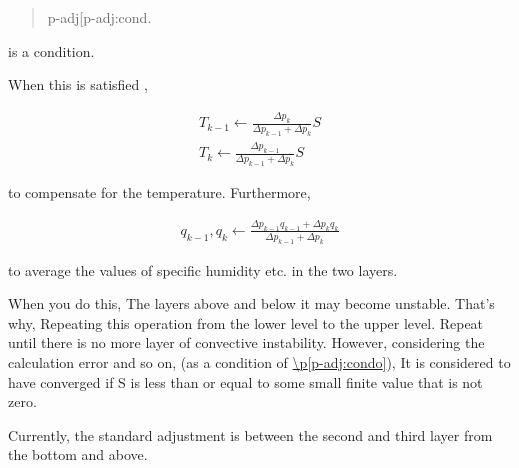 \begin{quote}
\protect\hypertarget{p-adj:cond}{}{p-adj{[}p-adj:cond\en{]}}.
\end{quote}

is a condition.

When this is satisfied ,

\begin{eqnarray}
T_{k-1}  \leftarrow  \frac{\Delta p_{k}}{\Delta p_{k-1} + \Delta p_{k}} S \\
T_{k}  \leftarrow  \frac{\Delta p_{k-1}}{\Delta p_{k-1} + \Delta p_{k}} S 
\end{eqnarray}

to compensate for the temperature. Furthermore,

\begin{eqnarray}
q_{k-1}, q_{k} \leftarrow
     \frac{\Delta p_{k-1} q_{k-1} + \Delta p_{k} q_{k}}
          {\Delta p_{k-1} + \Delta p_{k}} 
\end{eqnarray}

to average the values of specific humidity etc. in the two layers.

When you do this, The layers above and below it may become unstable.
That's why, Repeating this operation from the lower level to the upper
level. Repeat until there is no more layer of convective instability.
However, considering the calculation error and so on, (as a condition of
\protect\hyperlink{p-adj:condo}{\textbackslash p{[}p-adj:condo{]}}), It
is considered to have converged if S is less than or equal to some small
finite value that is not zero.

Currently, the standard adjustment is between the second and third layer
from the bottom and above.

